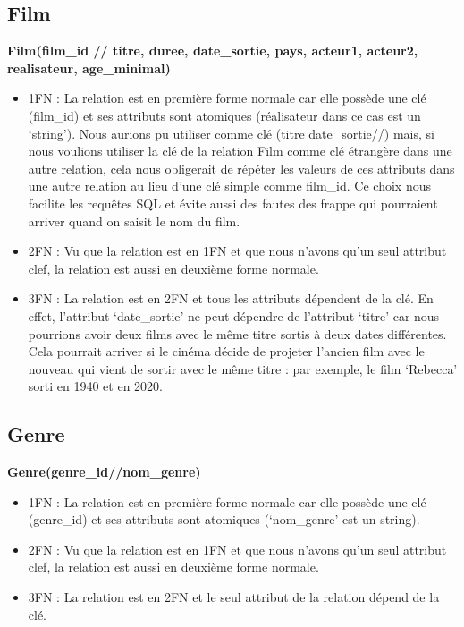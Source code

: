 \documentclass[12pt]{article}
\begin{document}
\subsection{Film}
\textbf{Film(film{\_}id // titre, duree, date{\_}sortie, pays, acteur1, acteur2, realisateur, age{\_}minimal)}
\begin{itemize}
    \item 1FN : La relation est en première forme normale car elle possède une clé (film{\_}id) et 
    ses attributs sont atomiques (réalisateur dans ce cas est un ‘string’). Nous aurions pu utiliser 
    comme clé (titre date{\_}sortie//) mais, si nous voulions utiliser la clé de la relation Film comme 
    clé étrangère dans une autre relation, cela nous obligerait de répéter les valeurs de ces attributs dans 
    une autre relation au lieu d’une clé simple comme film{\_}id. Ce choix nous 
    facilite les requêtes SQL et évite aussi des fautes des frappe qui pourraient arriver quand on saisit le nom du film. 
    \item 2FN : Vu que la relation est en 1FN et que nous n'avons qu'un seul attribut clef, la relation est aussi
    en deuxième forme normale.
    \item 3FN : La relation est en 2FN et tous les attributs dépendent de la clé. 
    En effet, l’attribut ‘date{\_}sortie’ ne peut dépendre de l’attribut ‘titre’ 
    car nous pourrions avoir deux films avec le même titre sortis à deux dates différentes. 
    Cela pourrait arriver si le cinéma décide de projeter l’ancien film avec le nouveau 
    qui vient de sortir avec le même titre : 
    par exemple, le film ‘Rebecca’ sorti en 1940 et en 2020.
\end{itemize}
\subsection{Genre}
\textbf{Genre(genre{\_}id//nom{\_}genre)}
\begin{itemize}
    \item 1FN : La relation est en première forme normale car elle possède une clé (genre{\_}id) et ses attributs sont atomiques (‘nom{\_}genre’ est un string). 
    \item 2FN : Vu que la relation est en 1FN et que nous n'avons qu'un seul attribut clef, la relation est aussi
    en deuxième forme normale.
    \item 3FN : La relation est en 2FN et le seul attribut de la relation dépend de la clé.
\end{itemize}
\pagebreak
\end{document}
